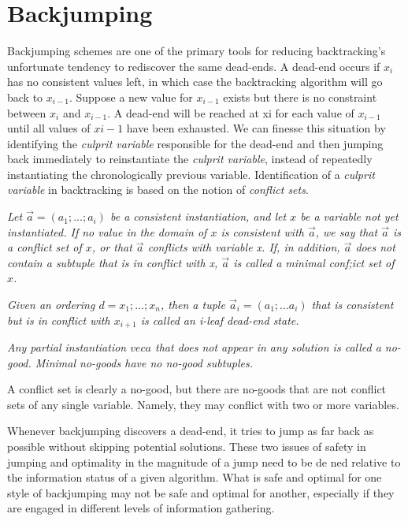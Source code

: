 \documentclass{article}
\begin{document}
\section{Backjumping}
Backjumping schemes are one of the primary tools for reducing backtracking's
unfortunate tendency to rediscover the same dead-ends. A dead-end occurs if
$x_i$ has no consistent values left, in which case the backtracking algorithm will
go back to $x_{i-1}$. Suppose a new value for $x_{i-1}$ exists but there is no constraint
between $x_i$ and $x_{i-1}$. A dead-end will be reached at xi for each value of $x_{i-1}$ until
all values of $x{i-1}$ have been exhausted. We can finesse
this situation by identifying the \textit{culprit variable} responsible for the dead-end and
then jumping back immediately to reinstantiate the \textit{culprit variable}, instead of
repeatedly instantiating the chronologically previous variable. Identification of
a \textit{culprit variable} in backtracking is based on the notion of \textit{conflict sets}.
\begin{definition} 
  \textit{Let $\vec{a} = (a_1; ...; a_i)$ be a consistent instantiation,
and let $x$ be a variable not yet instantiated. If no value in the domain of $x$ is
consistent with $\vec{a}$, we say that $\vec{a}$ is a conflict set of $x$, or that $\vec{a}$ conflicts with
variable x. If, in addition, $\vec{a}$ does not contain a subtuple that is in conflict with
x, $\vec{a}$ is called a minimal conf;ict set of $x$.}
\end{definition}
\smallskip
\begin{definition} 
  \textit{Given an ordering $d = x_1;...; x_n$, then a tuple $\vec{a}_i = (a_1 ; ... a_i)$ that is consistent but is in conflict with $x_{i+1}$ is called an
  i-leaf dead-end state.}
\end{definition}
\smallskip
\begin{definition}[no-good] 
  \textit{Any partial instantiation $vec{a}$ that does not appear in
  any solution is called a no-good. Minimal no-goods have no no-good subtuples.}
\end{definition}
\smallskip
A conflict set is clearly a no-good, but there are no-goods that are not conflict
sets of any single variable. Namely, they may conflict with two or more variables.

Whenever backjumping discovers a dead-end, it tries to jump as far back
as possible without skipping potential solutions. These two issues of safety in
jumping and optimality in the magnitude of a jump need to be de ned relative
to the information status of a given algorithm. What is safe and optimal for one
style of backjumping may not be safe and optimal for another, especially if they
are engaged in different levels of information gathering.
\end{document}
